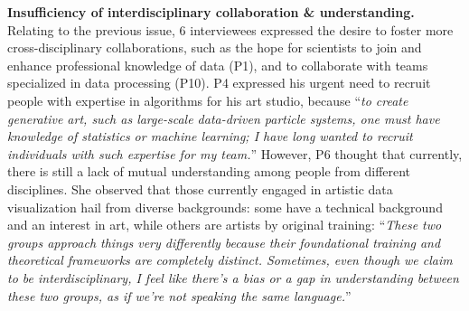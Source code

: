 \textbf{Insufficiency of interdisciplinary collaboration \& understanding.}
Relating to the previous issue, 6 interviewees expressed the desire to foster more cross-disciplinary collaborations, such as the hope for scientists to join and enhance professional knowledge of data (P1), and to collaborate with teams specialized in data processing (P10). 
P4 expressed his urgent need to recruit people with expertise in algorithms for his art studio, because ``\textit{to create generative art, such as large-scale data-driven particle systems, one must have knowledge of statistics or machine learning; I have long wanted to recruit individuals with such expertise for my team.}''
However, P6 thought that currently, there is still a lack of mutual understanding among people from different disciplines. She observed that those currently engaged in artistic data visualization hail from diverse backgrounds: some have a technical background and an interest in art, while others are artists by original training: ``\textit{These two groups approach things very differently because their foundational training and theoretical frameworks are completely distinct. Sometimes, even though we claim to be interdisciplinary, I feel like there’s a bias or a gap in understanding between these two groups, as if we’re not speaking the same language.}''



